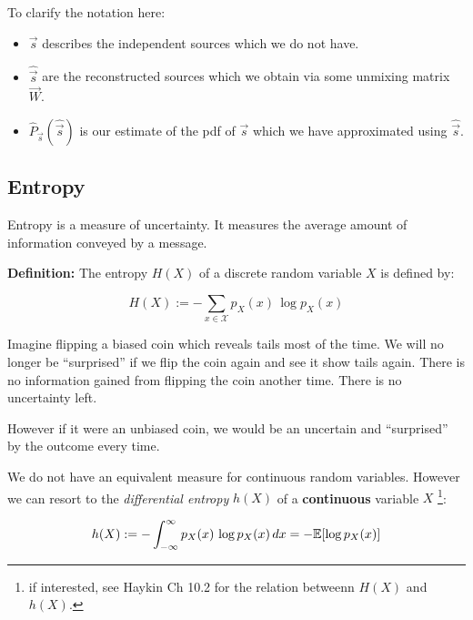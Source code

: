 To clarify the notation here:\\
\begin{itemize}
\vspace{-5mm}
\setlength\itemsep{0.1em}
\item $\vec s$ describes the independent sources which we do not have.
\item $\widehat{\vec s}$ are the reconstructed sources which we obtain via some unmixing matrix $\vec W$.
\item $\widehat{P}_{\vec s}(\widehat{\vec s})$ is our estimate of the pdf of $\vec s$ which we have approximated using $\widehat{\vec s}$. 
\end{itemize}

\subsection{Entropy}

Entropy is a measure of uncertainty. It measures the average amount of information conveyed by a message.

\textbf{Definition:} 
The entropy $H(X)$ of a discrete random variable $X$ is defined by:

\begin{equation}
\label{eq:entropy}
H(X) := - \sum_{x \in \mathcal X} p_X(x)\,\log p_X(x)
\end{equation}

Imagine flipping a biased coin which reveals tails most of the time. 
We will no longer be ``surprised'' if we flip the coin again and see it show tails again. 
There is no information gained from flipping the coin another time. There is no uncertainty left.

However if it were an unbiased coin, we would be an uncertain and ``surprised'' by the outcome every time.

We do not have an equivalent measure for continuous random variables. 
However we can resort to the \emph{differential entropy} $h(X)$ of a \textbf{continuous} variable $X$
\footnote{if interested, see Haykin Ch 10.2 for the relation betweenn $H(X)$ and $h(X)$.}:

\begin{equation}
\label{eq:entropydiff}
h(X) := - \int_{-\infty}^{\infty} p_X(x)\,\log p_X(x) \, dx 
= - \mathbb{E} \lbrack \log p_X(x) \rbrack
\end{equation}



